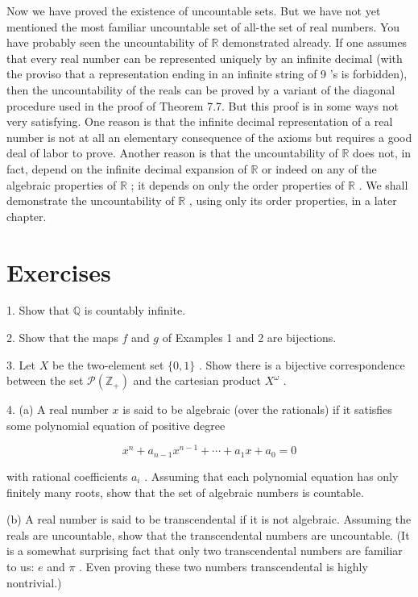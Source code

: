 Now we have proved the existence of uncountable sets. But we have not yet mentioned the most familiar uncountable set of all-the set of real numbers. You have probably seen the uncountability of \(\mathbb{R}\) demonstrated already. If one assumes that every real number can be represented uniquely by an infinite decimal (with the proviso that a representation ending in an infinite string of 9 's is forbidden), then the uncountability of the reals can be proved by a variant of the diagonal procedure used in the proof of Theorem 7.7. But this proof is in some ways not very satisfying. One reason is that the infinite decimal representation of a real number is not at all an elementary consequence of the axioms but requires a good deal of labor to prove. Another reason is that the uncountability of \(\mathbb{R}\) does not, in fact, depend on the infinite decimal expansion of \(\mathbb{R}\) or indeed on any of the algebraic properties of \(\mathbb{R}\) ; it depends on only the order properties of \(\mathbb{R}\) . We shall demonstrate the uncountability of \(\mathbb{R}\) , using only its order properties, in a later chapter.

\section*{Exercises}

1. Show that \(\mathbb{Q}\) is countably infinite.

2. Show that the maps \(f\) and \(g\) of Examples 1 and 2 are bijections.

3. Let \(X\) be the two-element set \(\{ 0,1\}\) . Show there is a bijective correspondence between the set \(\mathcal{P}\left( {\mathbb{Z}}_{ + }\right)\) and the cartesian product \({X}^{\omega }\) .

4. (a) A real number \(x\) is said to be algebraic (over the rationals) if it satisfies some polynomial equation of positive degree

\[
{x}^{n} + {a}_{n - 1}{x}^{n - 1} + \cdots  + {a}_{1}x + {a}_{0} = 0
\]

with rational coefficients \({a}_{i}\) . Assuming that each polynomial equation has only finitely many roots, show that the set of algebraic numbers is countable.

(b) A real number is said to be transcendental if it is not algebraic. Assuming the reals are uncountable, show that the transcendental numbers are uncountable. (It is a somewhat surprising fact that only two transcendental numbers are familiar to us: \(e\) and \(\pi\) . Even proving these two numbers transcendental is highly nontrivial.)

